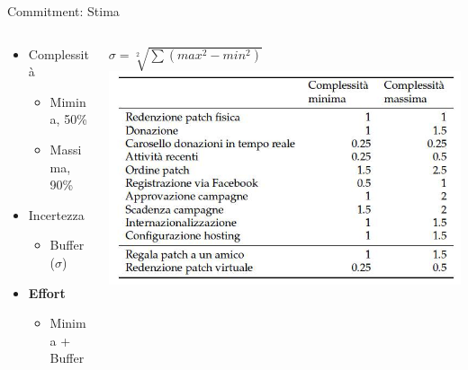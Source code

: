 \documentclass[compress, red, 14pt, pdf]{beamer}
\begin{document}
	\begin{frame}{Commitment: Stima}
		
		\begin{columns}[T]
		    \begin{column}{.5\textwidth}
		
				\begin{itemize}
					\item Complessità
					\begin{itemize}
						\item Mimina, 50\%
						\item Massima, 90\%
					\end{itemize}
					\item Incertezza
					\begin{itemize}
						\item Buffer ($ \sigma $)
					\end{itemize}
				\end{itemize}

				\begin{itemize}
					\item \textbf{Effort}
					\begin{itemize}
						\item Minima + Buffer
					\end{itemize}
				\end{itemize}
		
		    \end{column}
		    \begin{column}{.5\textwidth}
				{\small $ \sigma = \sqrt[2] { \sum \left ( max^{2} - min^{2} \right ) } $}
				\\ \vspace*{0.4cm}
				\hspace*{-0.8cm} \includegraphics[scale=0.28]{images/effort}
		    \end{column}
		 \end{columns}
	
	\end{frame}
\end{document}
